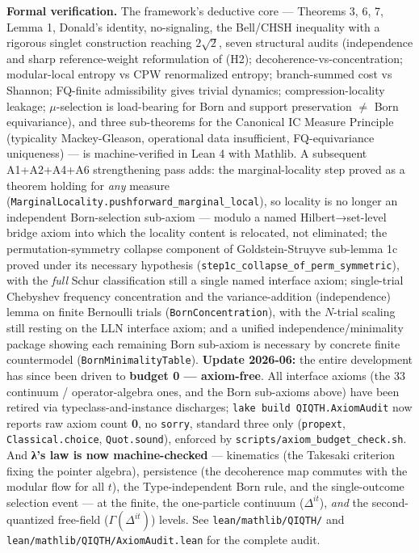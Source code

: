 \documentclass[11pt,a4paper]{article}
\newenvironment{qiqtquote}{\begin{mdframed}[style=quotestyle]}{\end{mdframed}}
\begin{document}
\begin{qiqtquote}
\textbf{Formal verification.} The framework's deductive core — Theorems 3, 6, 7, Lemma 1, Donald's identity, no-signaling, the Bell/CHSH inequality with a rigorous singlet construction reaching $2\sqrt{2}$, seven structural audits (independence and sharp reference-weight reformulation of (H2); decoherence-vs-concentration; modular-local entropy vs CPW renormalized entropy; branch-summed cost vs Shannon; FQ-finite admissibility gives trivial dynamics; compression-locality leakage; $\mu$-selection is load-bearing for Born and support preservation $\neq$ Born equivariance), and three sub-theorems for the Canonical IC Measure Principle (typicality Mackey-Gleason, operational data insufficient, FQ-equivariance uniqueness) — is machine-verified in Lean 4 with Mathlib. A subsequent A1+A2+A4+A6 strengthening pass adds: the marginal-locality step proved as a theorem holding for \emph{any} measure (\texttt{MarginalLocality.pushforward\_marginal\_local}), so locality is no longer an independent Born-selection sub-axiom — modulo a named Hilbert→set-level bridge axiom into which the locality content is relocated, not eliminated; the permutation-symmetry collapse component of Goldstein-Struyve sub-lemma 1c proved under its necessary hypothesis (\texttt{step1c\_collapse\_of\_perm\_symmetric}), with the \emph{full} Schur classification still a single named interface axiom; single-trial Chebyshev frequency concentration and the variance-addition (independence) lemma on finite Bernoulli trials (\texttt{BornConcentration}), with the $N$-trial scaling still resting on the LLN interface axiom; and a unified independence/minimality package showing each remaining Born sub-axiom is necessary by concrete finite countermodel (\texttt{BornMinimalityTable}). \textbf{Update 2026-06:} the entire development has since been driven to \textbf{budget 0 — axiom-free}. All interface axioms (the 33 continuum / operator-algebra ones, and the Born sub-axioms above) have been retired via typeclass-and-instance discharges; \texttt{lake build QIQTH.AxiomAudit} now reports raw axiom count \textbf{0}, no \texttt{sorry}, standard three only (\texttt{propext}, \texttt{Classical.choice}, \texttt{Quot.sound}), enforced by \texttt{scripts/axiom\_budget\_check.sh}. And \textbf{λ's law is now machine-checked} — kinematics (the Takesaki criterion fixing the pointer algebra), persistence (the decoherence map commutes with the modular flow for all $t$), the Type-independent Born rule, and the single-outcome selection event — at the finite, the one-particle continuum ($\Delta^{it}$), \emph{and} the second-quantized free-field ($\Gamma(\Delta^{it})$) levels. See \texttt{lean/mathlib/QIQTH/} and \texttt{lean/mathlib/QIQTH/AxiomAudit.lean} for the complete audit.
\end{qiqtquote}
\end{document}
